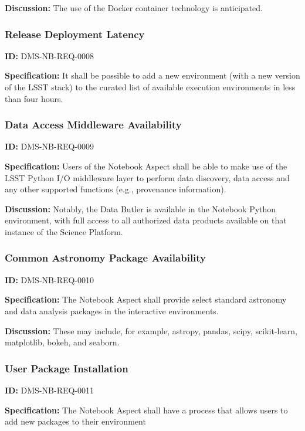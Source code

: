 \documentclass[SE,toc]{lsstdoc}
\begin{document}
\textbf{Discussion:}
The use of the Docker container technology is anticipated.

\subsubsection{Release Deployment Latency}

\label{DMS-NB-REQ-0008}
\textbf{ID:} DMS-NB-REQ-0008

\textbf{Specification:}
It shall be possible to add a new environment (with a new version of the LSST stack) to the curated list of available execution environments in less than four hours.

\subsubsection{Data Access Middleware Availability}

\label{DMS-NB-REQ-0009}
\textbf{ID:} DMS-NB-REQ-0009

\textbf{Specification:}
Users of the Notebook Aspect shall be able to make use of the LSST Python I/O middleware layer to perform data discovery, data access and any other supported functions  (e.g., provenance information).

\textbf{Discussion:}
Notably, the Data Butler is available in the Notebook Python environment, with full access to all authorized data products available on that instance of the Science Platform.

\subsubsection{Common Astronomy Package Availability}

\label{DMS-NB-REQ-0010}
\textbf{ID:} DMS-NB-REQ-0010

\textbf{Specification:}
The Notebook Aspect shall provide select standard astronomy and data analysis packages in the interactive environments.

\textbf{Discussion:}
These may include, for example, astropy, pandas, scipy, scikit-learn, matplotlib, bokeh, and seaborn.

\subsubsection{User Package Installation}

\label{DMS-NB-REQ-0011}
\textbf{ID:} DMS-NB-REQ-0011

\textbf{Specification:}
The Notebook Aspect shall have a process that allows users to add new packages to their environment
\end{document}
